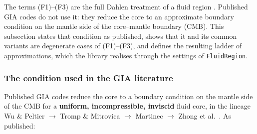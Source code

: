 \documentclass[11pt]{article}
\numberwithin{equation}{section}
\theoremstyle{remark}
\newcommand{\code}[1]{\texttt{#1}}
\begin{document}
The terms (F1)--(F3) are the full Dahlen treatment of a fluid region
\cite{Dahlen1974,DahlenTromp1998,AW10}. Published GIA codes do not use it:
they reduce the core to an approximate boundary condition on the mantle
side of the core--mantle boundary (CMB). This subsection states that
condition as published, shows that it and its common variants are
degenerate cases of (F1)--(F3), and defines the resulting ladder of
approximations, which the library realises through the settings of
\code{FluidRegion}.

\subsubsection{The condition used in the GIA literature}

Published GIA codes reduce the core to a boundary condition on the mantle
side of the CMB for a \textbf{uniform, incompressible, inviscid} fluid
core, in the lineage Wu \& Peltier \cite{WuPeltier1982} $\to$ Tromp \&
Mitrovica \cite{TrompMitrovica1999} $\to$ Martinec \cite{Martinec2000}
$\to$ Zhong et al.\ \cite{Zhong2003}. As published:
\end{document}

